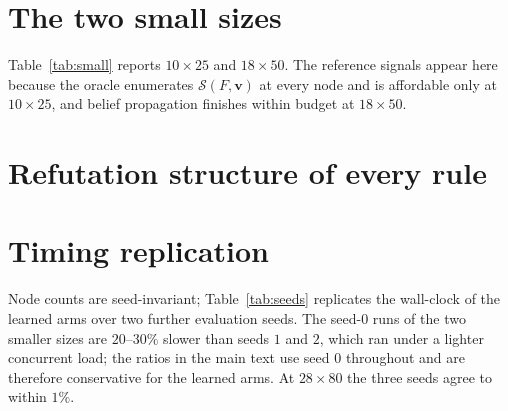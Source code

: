 \documentclass[final,5p,times,twocolumn,authoryear]{elsarticle}
\newcommand{\SOL}{\mathcal{S}}
\begin{document}
\appendix
\section{The two small sizes}
\label{app:small}

Table~\ref{tab:small} reports $10\times25$ and $18\times50$. The reference signals appear here because the oracle enumerates $\SOL(F,\mathbf{v})$ at every node and is affordable only at $10\times25$, and belief propagation finishes within budget at $18\times50$.

\section{Refutation structure of every rule}
\label{app:trace}


\section{Timing replication}
\label{app:seeds}

Node counts are seed-invariant; Table~\ref{tab:seeds} replicates the wall-clock of the learned arms over two further evaluation seeds. The seed-$0$ runs of the two smaller sizes are $20$--$30\%$ slower than seeds $1$ and $2$, which ran under a lighter concurrent load; the ratios in the main text use seed $0$ throughout and are therefore conservative for the learned arms. At $28\times80$ the three seeds agree to within $1\%$.



\end{document}
